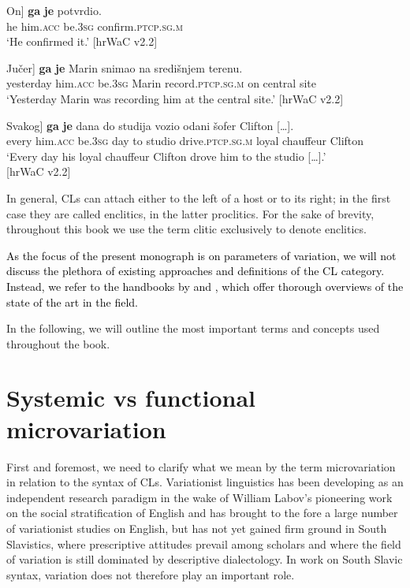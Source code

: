\begin{exe}
\ex\label{(2.1)}
\gll \minsp{[} On] \textbf{ga} \textbf{je} potvrdio. \\
{} he him\textsc{.acc} be\textsc{.3sg} confirm\textsc{.ptcp.sg.m} \\
\glt ‘He confirmed it.’
\hfill [hrWaC v2.2]

\ex\label{(2.2)}
\gll \minsp{[} Jučer] \textbf{ga} \textbf{je} Marin snimao na središnjem terenu. \\
{} yesterday him\textsc{.acc} be\textsc{.3sg} Marin record\textsc{.ptcp.sg.m} on central site \\
\glt ‘Yesterday Marin was recording him at the central site.’
\hfill [hrWaC v2.2]

\ex\label{(2.3)}
\gll \minsp{[} Svakog] \textbf{ga} \textbf{je} dana do studija vozio odani šofer {Clifton [\dots].}   \\
{} every him\textsc{.acc} be\textsc{.3sg} day to studio drive\textsc{.ptcp.sg.m} loyal chauffeur Clifton  \\
\glt ‘Every day his loyal chauffeur Clifton drove him to the studio [\dots].’ \\
\xspace \hfill [hrWaC v2.2]
\end{exe}\clearpage

\noindent In general, CLs can attach either to the left of a host or to its right; in the first case they are called enclitics, in the latter proclitics. For the sake of brevity, throughout this book we use the term clitic exclusively to denote enclitics. 

 \textcolor{black}{As the focus of the present monograph is on parameters of variation, we will not discuss the plethora of existing approaches and definitions of the CL category. Instead, we refer to the handbooks by \citet{SpencerLuis12} and \citet{FranksKing00}, which offer thorough overviews of the state of the art in the field.}

In the following, we will outline the most important terms and concepts used throughout the book. 

\section{Systemic vs functional microvariation}
\label{Systemic vs functional microvariation}
First and foremost, we need to clarify what we mean by the term microvariation in relation to the syntax of CLs. Variationist linguistics has been developing as an independent research paradigm  in the wake of William Labov’s pioneering work on the social stratification of English and has brought to the fore a large number of variationist studies on English, but has not yet gained firm ground in South Slavistics, where prescriptive attitudes prevail among scholars and where the field of variation is still dominated by descriptive dialectology. In work on South Slavic syntax, variation does not therefore play an important role.

